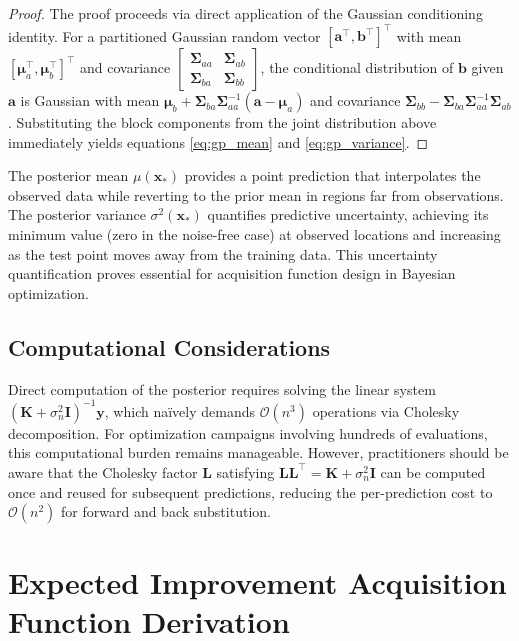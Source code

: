 \begin{proof}
The proof proceeds via direct application of the Gaussian conditioning identity. For a partitioned Gaussian random vector $[\mathbf{a}^\top, \mathbf{b}^\top]^\top$ with mean $[\boldsymbol{\mu}_a^\top, \boldsymbol{\mu}_b^\top]^\top$ and covariance $\begin{bmatrix} \boldsymbol{\Sigma}_{aa} & \boldsymbol{\Sigma}_{ab} \\ \boldsymbol{\Sigma}_{ba} & \boldsymbol{\Sigma}_{bb} \end{bmatrix}$, the conditional distribution of $\mathbf{b}$ given $\mathbf{a}$ is Gaussian with mean $\boldsymbol{\mu}_b + \boldsymbol{\Sigma}_{ba} \boldsymbol{\Sigma}_{aa}^{-1}(\mathbf{a} - \boldsymbol{\mu}_a)$ and covariance $\boldsymbol{\Sigma}_{bb} - \boldsymbol{\Sigma}_{ba} \boldsymbol{\Sigma}_{aa}^{-1} \boldsymbol{\Sigma}_{ab}$. Substituting the block components from the joint distribution above immediately yields equations \eqref{eq:gp_mean} and \eqref{eq:gp_variance}.
\end{proof}

The posterior mean $\mu(\mathbf{x}_*)$ provides a point prediction that interpolates the observed data while reverting to the prior mean in regions far from observations. The posterior variance $\sigma^2(\mathbf{x}_*)$ quantifies predictive uncertainty, achieving its minimum value (zero in the noise-free case) at observed locations and increasing as the test point moves away from the training data. This uncertainty quantification proves essential for acquisition function design in Bayesian optimization.

\subsection{Computational Considerations}

Direct computation of the posterior requires solving the linear system $(\mathbf{K} + \sigma_n^2 \mathbf{I})^{-1} \mathbf{y}$, which na\"{i}vely demands $\mathcal{O}(n^3)$ operations via Cholesky decomposition. For optimization campaigns involving hundreds of evaluations, this computational burden remains manageable. However, practitioners should be aware that the Cholesky factor $\mathbf{L}$ satisfying $\mathbf{L}\mathbf{L}^\top = \mathbf{K} + \sigma_n^2 \mathbf{I}$ can be computed once and reused for subsequent predictions, reducing the per-prediction cost to $\mathcal{O}(n^2)$ for forward and back substitution.

\section{Expected Improvement Acquisition Function Derivation}
\label{sec:ei_derivation}

